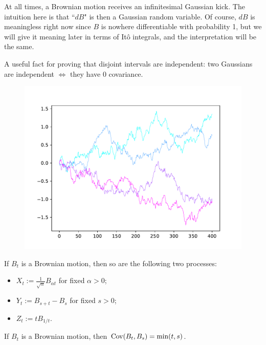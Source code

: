 \documentclass[twoside,10pt]{report}
\begin{document}
At all times, a Brownian motion receives an infinitesimal Gaussian kick. The intuition here is that ``$dB$" is then a Gaussian random variable. Of course, $dB$ is meaningless right now since $B$ is nowhere differentiable with probability 1, but we will give it meaning later in terms of It\^o integrals, and the interpretation will be the same.

A useful fact for proving that disjoint intervals are independent: two Gaussians are independent $\iff$ they have 0 covariance.

\begin{figure}[H]
	\centering
	\includegraphics[scale=0.6]{fig/brownian.pdf}
\end{figure}

\begin{prop}
	If $B_{t}$ is a Brownian motion, then so are the following two processes:
	\begin{itemize}
		\item $X_{t} := \frac{1}{\sqrt{\alpha} } B_{\alpha t}$ for fixed $\alpha > 0$;
		\item $Y_{t} := B_{s+t} - B_{s}$ for fixed $s>0$;
		\item $Z_{t} := t B_{1/t}$.
	\end{itemize}
\end{prop}

\begin{prop}
If $B_{t}$ is a Brownian motion, then $\operatorname{Cov}(B_{t},B_{s}) = \min(t,s)$.
\end{prop}

\end{document}
